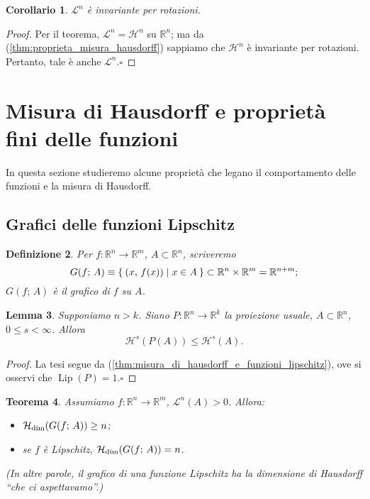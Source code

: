 \documentclass[a4paper,10pt,openright,oneside]{book}
\theoremstyle{theoremstyle}
\newtheorem{teorema}{Teorema}[section]
\newtheorem{lemma}[teorema]{Lemma}
\newtheorem{corollario}[teorema]{Corollario}
\theoremstyle{theoremstylewoheader}
\theoremstyle{theoremstyle}
\newtheorem{definizione}[teorema]{Definizione}
\theoremstyle{proofsecstyle}
\theoremstyle{nonumberplain}
\newtheorem{proof}{Dim.}
\newcommand{\RR}{\ensuremath{\mathbb{R}}}
\newcommand{\Leb}{\ensuremath{\mathcal{L}}}
\newcommand{\Haus}{\ensuremath{\mathcal{H}}}
\newcommand{\Hausdim}{\ensuremath{\Haus_\textup{dim}}}
\DeclareMathOperator{\Lip}{Lip}
\renewcommand{\qedsymbol}{\ensuremath{\square}}
\newcommand{\qed}{\unskip\nobreak\hfill\nobreak\hspace{.5em}\qedsymbol}
\begin{document}
\begin{corollario}
\label{cor:misura_lebesgue_est_invariante_per_rotazioni}
$\Leb^n$ è invariante per rotazioni.
\end{corollario}

\begin{proof}
Per il teorema, $\Leb^n = \Haus^n$ su $\RR^n$; ma da (\ref{thm:proprieta_misura_hausdorff}) sappiamo che $\Haus^n$ è invariante per rotazioni. Pertanto, tale è anche $\Leb^n$.\qed
\end{proof} 

\section{Misura di Hausdorff e proprietà fini delle funzioni}

In questa sezione studieremo alcune proprietà che legano il comportamento delle funzioni e la misura di Hausdorff.

\subsection{Grafici delle funzioni Lipschitz}

\begin{definizione}
Per $f : \RR^n \rightarrow \RR^m$, $A \subset \RR^n$, scriveremo
\[
G(f;\, A) \equiv \Set{(x,\, f(x)) | x \in A } \subset \RR^n \times \RR^m = \RR^{n+m};
\]
$G(f;\, A)$ è il \emph{grafico} di $f$ su $A$.
\end{definizione}

\begin{lemma}
\label{lem:dimensione_proiezione}
Supponiamo $n > k$. Siano $P : \RR^n \rightarrow \RR^k$ la proiezione usuale, $A \subset \RR^n$, $0 \le s < \infty$. Allora
\[
\Haus^s(P(A)) \le \Haus^s(A).
\]
\end{lemma}

\begin{proof}
La tesi segue da (\ref{thm:misura_di_hausdorff_e_funzioni_lipschitz}), ove si osservi che $\Lip(P) = 1$.\qed
\end{proof}

\begin{teorema}
\label{thm:grafico_funzioni_lipschitz}
Assumiamo $f : \RR^n \rightarrow \RR^m$, $\Leb^n(A) > 0$. Allora:
\begin{itemize}
\item[(i)] $\Hausdim(G(f;\, A)) \ge n$;
\item[(ii)] se $f$ è Lipschitz, $\Hausdim(G(f;\, A)) = n$.
\end{itemize}
(In altre parole, il grafico di una funzione Lipschitz ha la dimensione di Hausdorff ``che ci aspettavamo''.)
\end{teorema}
\end{document}
